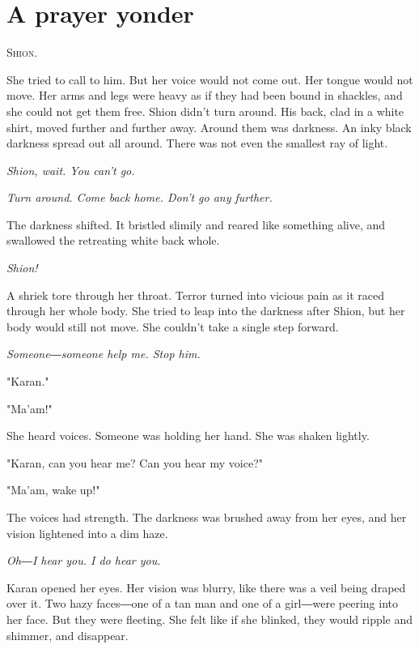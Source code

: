 
\chapter{A prayer yonder}


\lettrine{S}{hion}.

She tried to call to him. But her voice would not come out. Her tongue
would not move. Her arms and legs were heavy as if they had been bound
in shackles, and she could not get them free. Shion didn't turn around.
His back, clad in a white shirt, moved further and further away. Around
them was darkness. An inky black darkness spread out all around. There
was not even the smallest ray of light.

\emph{Shion, wait. You can't go.}

\emph{Turn around. Come back home. Don't go any further.}

The darkness shifted. It bristled slimily and reared like something
alive, and swallowed the retreating white back whole.

\emph{Shion!}

A shriek tore through her throat. Terror turned into vicious pain as it
raced through her whole body. She tried to leap into the darkness after
Shion, but her body would still not move. She couldn't take a single
step forward.

\emph{Someone―someone help me. Stop him.}

"Karan."

"Ma'am!"

She heard voices. Someone was holding her hand. She was shaken lightly.

"Karan, can you hear me? Can you hear my voice?"

"Ma'am, wake up!"

The voices had strength. The darkness was brushed away from her eyes,
and her vision lightened into a dim haze.

\emph{Oh―I hear you. I do hear you.}

Karan opened her eyes. Her vision was blurry, like there was a veil
being draped over it. Two hazy faces―one of a tan man and one of a
girl―were peering into her face. But they were fleeting. She felt like
if she blinked, they would ripple and shimmer, and disappear.

